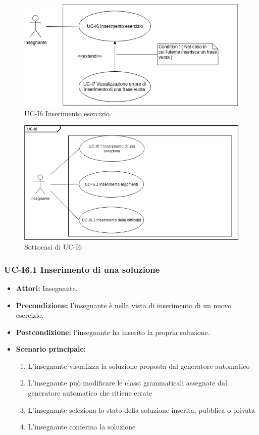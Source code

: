 	\begin{figure}[h]
		\centering
		\includegraphics[scale=0.7]{images/UC-I6ext.png}
		\caption{UC-I6 Inserimento esercizio}
	\end{figure}
	\begin{figure}[h]
		\centering
		\includegraphics[scale=0.7]{images/UC-I6.png}
		\caption{Sottocasi di UC-I6}
	\end{figure}

\subsubsection{UC-I6.1 Inserimento di una soluzione}
\begin{itemize}
\item \textbf{Attori: }Insegnante.
\item \textbf{Precondizione: }l'insegnante è nella vista di inserimento di un nuovo esercizio.
\item \textbf{Postcondizione: }l'insegnante ha inserito la propria soluzione.
\item \textbf{Scenario principale: }
		\begin{enumerate} 
		\item L'insegnante visualizza la soluzione proposta dal generatore automatico
		\item L'insegnante può modificare le classi grammaticali assegnate dal generatore automatico che ritiene errate
		\item L'insegnante seleziona lo stato della soluzione inserita, pubblica o privata
		\item L'insegnante conferma la soluzione
		\end{enumerate}	
\end{itemize}

